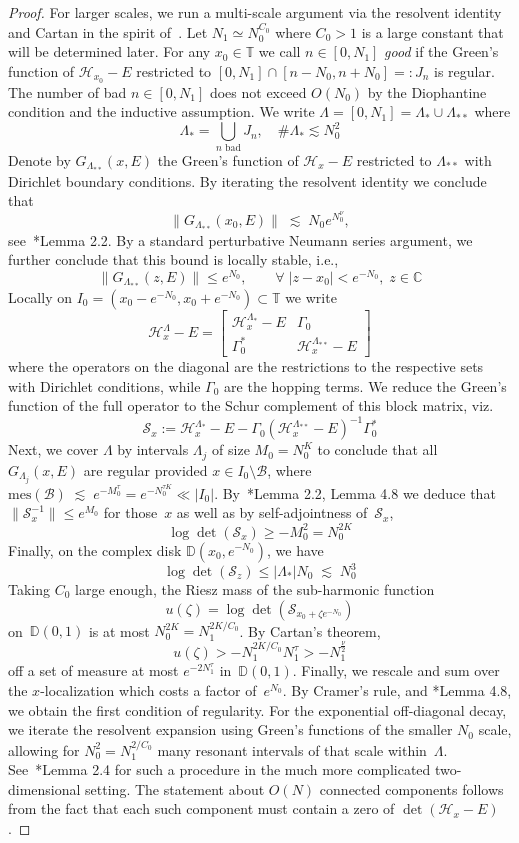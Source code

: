\documentclass[11pt]{amsart}
\newcommand{\C}{\mathbb C}
\def\mes{\mathrm{mes}}
\def\calB{\mathcal{B}}
\def\calH{\mathcal{H}}
\def\tor{\mathbb{T}}
\def\les{\;\mathrm{\lesssim}\;}
\def\calS{\mathcal{S}}
\def\disk{\mathbb{D}}
\begin{document}
\begin{proof}
    For larger scales, we run a multi-scale argument via the resolvent identity and Cartan in the spirit of~\cite{BGS}.
Let $N_1\simeq N_0^{C_0}$ where $C_0>1$ is a large constant that will be determined later. For any $x_0\in\tor$ we call  $n\in [0,N_1]$ {\em good} if the Green's function of $\calH_{x_0}-E$ restricted to $[0,N_1]\cap [n-N_0,n+N_0]=:J_n$ is regular. The number of bad $n\in [0,N_1]$ does not exceed $O(N_0)$ by the Diophantine condition and the inductive assumption. We write $\Lambda=[0,N_1]=\Lambda_* \cup \Lambda_{**}$ where 
\[
\Lambda_* = \bigcup_{n\text{\ bad}} J_n, \quad \# \Lambda_* \lesssim N_0^2
\]
Denote by $G_{\Lambda_{**}}(x,E)$ the Green's function of $\calH_x-E$ restricted to $\Lambda_{**}$ with Dirichlet boundary conditions. By iterating the resolvent identity we conclude that 
\[
\| G_{\Lambda_{**}}(x_0,E)\|\les N_0  e^{N_0^\nu},
\]
see~\cite{BGS}*{Lemma 2.2}. By a standard perturbative Neumann series argument, we further conclude that this bound is locally stable, i.e., 
\[
\| G_{\Lambda_{**}}(z,E)\|\le  e^{N_0}, \qquad \forall\; |z-x_0|<e^{-N_0},\; z\in\C
\]
Locally on $I_0=(x_0-e^{-N_0}, x_0+e^{-N_0})\subset\tor$ we write 
\[
\calH_x^{\Lambda}-E = \left [ \begin{matrix}
     \calH_x^{\Lambda_{*}} -E   &  \Gamma_0 \\   \Gamma_0^* &  \calH_x^{\Lambda_{**}} -E
    \end{matrix}\right]
\]
    where the operators on the diagonal are the restrictions to the respective sets  with Dirichlet conditions, while $\Gamma_0$ are the hopping terms. We reduce the Green's function of the full operator to the Schur complement of this block matrix, viz. 
    \[
    \calS_x := \calH_x^{\Lambda_{*}} -E  - \Gamma_0 (\calH_x^{\Lambda_{**}} -E)^{-1} \Gamma_0^*
    \]
Next, we cover $\Lambda$ by intervals $\Lambda_j$ of size $M_0=N_0^K$ to conclude that  all $G_{\Lambda_j}(x,E)$ are regular provided $x\in I_0\setminus \calB$, where  $\mes(\calB) \les e^{-M_0^\tau} = e^{-N_0^{\tau K}}\ll |I_0|$. 
By~\cite{BGS}*{Lemma 2.2, Lemma 4.8} we deduce that $\|\calS_x^{-1}\|\le e^{M_0}$ for those~$x$ as well as by self-adjointness of~$\calS_x$, 
\[
\log \det(\calS_x)\ge -M_0^2 = N_0^{2K}
\]
    Finally,  on the complex disk $\disk(x_0, e^{-N_0})$, we have
    \[
    \log\det (\calS_z)\le |\Lambda_*| N_0 \les N_0^3
    \]
    Taking $C_0$ large enough, the Riesz mass of the sub-harmonic function 
    \[ 
    u(\zeta )=\log\det (\calS_{x_0+\zeta e^{-N_0}})
    \]
    on~$\disk(0,1)$ is at most $N_0^{2K}=N_1^{{2K}/{C_0}}$. By Cartan's theorem, \[ u(\zeta)> - N_1^{{2K}/{C_0}} N_1^{\tau}> -N_1^{\frac{\nu}{2}}\] off a set of measure at most $e^{-2N_1^\tau}$ in~$\disk(0,1)$. Finally, we rescale and sum over the $x$-localization which costs a factor of~$e^{N_0}$. By Cramer's rule, and \cite{BGS}*{Lemma 4.8}, we obtain the first condition of regularity. For the exponential off-diagonal decay, we iterate the resolvent expansion using Green's functions of the smaller $N_0$ scale, allowing for $N_0^2= N_1^{2/C_0}$ many resonant intervals of that scale within~$\Lambda$. See~\cite{BGS}*{Lemma 2.4} for such a procedure in the much more complicated two-dimensional setting. The statement about $O(N)$ connected components follows from the fact that each such component must contain a zero of $\det(\calH_x-E)$. 

\end{proof}
\end{document}
